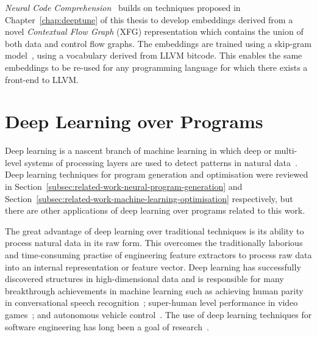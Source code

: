 \emph{Neural Code Comprehension}~\cite{Ben-nun2018} builds on techniques proposed in Chapter~\ref{chap:deeptune} of this thesis to develop embeddings derived from a novel \emph{Contextual Flow Graph} (XFG) representation which contains the union of both data and control flow graphs. The embeddings are trained using a skip-gram model~\cite{Mikolov2013a}, using a vocabulary derived from LLVM bitcode. This enables the same embeddings to be re-used for any programming language for which there exists a front-end to LLVM.



\section{Deep Learning over Programs}
\label{sec:related-work-other}

Deep learning is a nascent branch of machine learning in which deep or multi-level systems of processing layers are used to detect patterns in natural data~\cite{LeCun2015,Wang2017}. Deep learning techniques for program generation and optimisation were reviewed in Section~\ref{subsec:related-work-neural-program-generation} and Section~\ref{subsec:related-work-machine-learning-optimisation} respectively, but there are other applications of deep learning over programs related to this work.

The great advantage of deep learning over traditional techniques is its ability to process natural data in its raw form. This overcomes the traditionally laborious and time-consuming practise of engineering feature extractors to process raw data into an internal representation or feature vector. Deep learning has successfully discovered structures in high-dimensional data and is responsible for many breakthrough achievements in machine learning such as achieving human parity in conversational speech recognition~\cite{Xiong2016}; super-human level performance in video games~\cite{Mnih2015}; and autonomous vehicle control~\cite{Lozano-Perez2012}. The use of deep learning techniques for software engineering has long been a goal of research~\cite{White2015a}.

